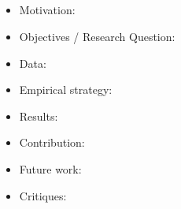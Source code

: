 \documentclass{article}
\theoremstyle{definition}
\begin{document}
\subsection*{\cite{galenianos2020regulatory}}
   \begin{itemize}
   \item Motivation: \\ 
    
    \item Objectives / Research Question:\\
    
    \item Data: \\ 
    
    \item Empirical strategy: \\ 

    
    \item Results: \\  
    
    \item Contribution:
    
    \item Future work: 
    
    \item Critiques: 
    
    \end{itemize}




\end{document}
